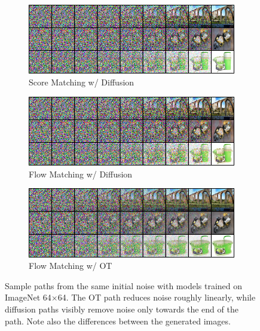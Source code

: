 \documentclass{article}
\begin{document}
\begin{figure}
    \centering
    \begin{subfigure}[b]{0.32\linewidth}
        \includegraphics[width=\linewidth]{figures/imagenet64/imagenet64_sm_difv2.png}
        \caption*{\scriptsize Score Matching w/ Diffusion}
    \end{subfigure}
    \begin{subfigure}[b]{0.32\linewidth}
        \includegraphics[width=\linewidth]{figures/imagenet64/imagenet64_fm_difv2.png}
        \caption*{\scriptsize Flow Matching w/ Diffusion}
    \end{subfigure} 
    \begin{subfigure}[b]{0.32\linewidth}
        \includegraphics[width=\linewidth]{figures/imagenet64/imagenet64_fm_otv2.png}
        \caption*{\scriptsize Flow Matching w/ OT}
    \end{subfigure}\vspace{-5pt}
    \caption{Sample paths from the same initial noise with models trained on ImageNet 64$\times$64. The OT path reduces noise roughly linearly, while diffusion paths visibly remove noise only towards the end of the path. Note also the differences between the generated images.}\vspace{-10pt}
    \label{fig:sample_paths}
\end{figure}
\end{document}
